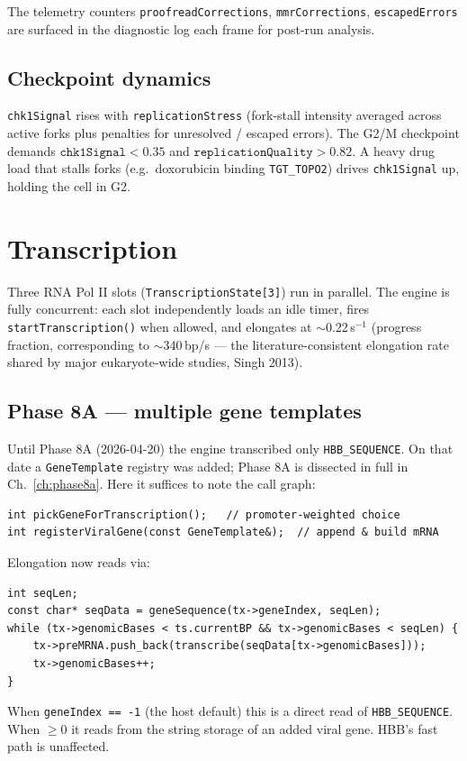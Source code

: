\documentclass[11pt,letterpaper,twoside,openany]{book}
\newcommand{\code}[1]{\texttt{#1}}
\begin{document}
The telemetry counters \code{proofreadCorrections},
\code{mmrCorrections}, \code{escapedErrors} are surfaced in the
diagnostic log each frame for post-run analysis.

\section{Checkpoint dynamics}

\code{chk1Signal} rises with \code{replicationStress} (fork-stall
intensity averaged across active forks plus penalties for unresolved
/ escaped errors). The G2/M checkpoint demands
$\code{chk1Signal}< 0.35$ and $\code{replicationQuality} > 0.82$. A
heavy drug load that stalls forks (e.g.\ doxorubicin binding
\code{TGT\_TOPO2}) drives \code{chk1Signal} up, holding the cell in
G2.

\chapter{Transcription}
\label{ch:transcription}

Three RNA Pol II slots (\code{TranscriptionState[3]}) run in
parallel. The engine is fully concurrent: each slot independently
loads an idle timer, fires \code{startTranscription()} when allowed,
and elongates at $\sim$0.22\,s$^{-1}$ (progress fraction, corresponding
to $\sim$340\,bp/s --- the literature-consistent elongation rate
shared by major eukaryote-wide studies, Singh 2013).

\section{Phase 8A --- multiple gene templates}

Until Phase 8A (2026-04-20) the engine transcribed only
\code{HBB\_SEQUENCE}. On that date a \code{GeneTemplate} registry was
added; Phase 8A is dissected in full in Ch.~\ref{ch:phase8a}.
Here it suffices to note the call graph:

\begin{lstlisting}
int pickGeneForTranscription();   // promoter-weighted choice
int registerViralGene(const GeneTemplate&);  // append & build mRNA
\end{lstlisting}

Elongation now reads via:
\begin{lstlisting}
int seqLen;
const char* seqData = geneSequence(tx->geneIndex, seqLen);
while (tx->genomicBases < ts.currentBP && tx->genomicBases < seqLen) {
    tx->preMRNA.push_back(transcribe(seqData[tx->genomicBases]));
    tx->genomicBases++;
}
\end{lstlisting}
When \code{geneIndex == -1} (the host default) this is a direct read
of \code{HBB\_SEQUENCE}. When $\ge 0$ it reads from the string
storage of an added viral gene. HBB's fast path is unaffected.
\end{document}

